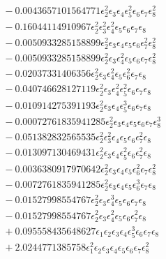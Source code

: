 \documentclass[10pt]{article}
\begin{document}
\begin{align*}
&{}  - 0.0043657101564771 \epsilon_{2}^{2} \epsilon_{3} \epsilon_{4} \epsilon_{5}^{2} \epsilon_{6} \epsilon_{7} \epsilon_{8}^{2} \\
&{}  - 0.16044114910967 \epsilon_{2}^{2} \epsilon_{3}^{2} \epsilon_{4}^{2} \epsilon_{5} \epsilon_{6} \epsilon_{7} \epsilon_{8} \\
&{}  - 0.0050933285158899 \epsilon_{2}^{2} \epsilon_{3} \epsilon_{4} \epsilon_{5} \epsilon_{6} \epsilon_{7}^{2} \epsilon_{8}^{2} \\
&{}  - 0.0050933285158899 \epsilon_{2}^{2} \epsilon_{3} \epsilon_{4}^{2} \epsilon_{5} \epsilon_{6} \epsilon_{7} \epsilon_{8}^{2} \\
&{}  - 0.02037331406356 \epsilon_{2}^{2} \epsilon_{3} \epsilon_{4}^{2} \epsilon_{5} \epsilon_{6}^{2} \epsilon_{7} \epsilon_{8} \\
&{}  - 0.040746628127119 \epsilon_{2}^{2} \epsilon_{3} \epsilon_{4}^{2} \epsilon_{5}^{2} \epsilon_{6} \epsilon_{7} \epsilon_{8} \\
&{}  - 0.010914275391193 \epsilon_{2}^{2} \epsilon_{3} \epsilon_{4} \epsilon_{5}^{3} \epsilon_{6} \epsilon_{7} \epsilon_{8} \\
&{}  - 0.00072761835941285 \epsilon_{2}^{2} \epsilon_{3} \epsilon_{4} \epsilon_{5} \epsilon_{6} \epsilon_{7} \epsilon_{8}^{3} \\
&{}  - 0.051382832565535 \epsilon_{2}^{2} \epsilon_{3}^{2} \epsilon_{4} \epsilon_{5} \epsilon_{6} \epsilon_{7}^{2} \epsilon_{8} \\
&{}  - 0.013097130469431 \epsilon_{2}^{2} \epsilon_{3} \epsilon_{4} \epsilon_{5}^{2} \epsilon_{6} \epsilon_{7}^{2} \epsilon_{8} \\
&{}  - 0.0036380917970642 \epsilon_{2}^{2} \epsilon_{3} \epsilon_{4} \epsilon_{5} \epsilon_{6}^{2} \epsilon_{7} \epsilon_{8}^{2} \\
&{}  - 0.0072761835941285 \epsilon_{2}^{2} \epsilon_{3} \epsilon_{4} \epsilon_{5} \epsilon_{6}^{3} \epsilon_{7} \epsilon_{8} \\
&{}  - 0.01527998554767 \epsilon_{2}^{2} \epsilon_{3} \epsilon_{4}^{3} \epsilon_{5} \epsilon_{6} \epsilon_{7} \epsilon_{8} \\
&{}  - 0.01527998554767 \epsilon_{2}^{2} \epsilon_{3} \epsilon_{4}^{2} \epsilon_{5} \epsilon_{6} \epsilon_{7}^{2} \epsilon_{8} \\
&{}  + 0.095558435648627 \epsilon_{1} \epsilon_{2} \epsilon_{3} \epsilon_{4} \epsilon_{5}^{3} \epsilon_{6} \epsilon_{7} \epsilon_{8} \\
&{}  + 2.0244771385758 \epsilon_{1}^{2} \epsilon_{2} \epsilon_{3} \epsilon_{4} \epsilon_{5} \epsilon_{6} \epsilon_{7} \epsilon_{8}^{2} \\

\end{align*}
\end{document}
